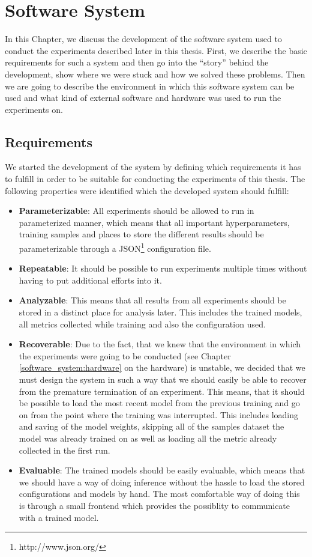 \chapter{Software System}
\label{software_system}
In this Chapter, we discuss the development of the software system used to conduct the experiments described later in this thesis. First, we describe the basic requirements for such a system and then go into the ``story'' behind the development, show where we were stuck and how we solved these problems. Then we are going to describe the environment in which this software system can be used and what kind of external software and hardware was used to run the experiments on.

\section{Requirements}
We started the development of the system by defining which requirements it has to fulfill in order to be suitable for conducting the experiments of this thesis. The following properties were identified which the developed system should fulfill:

\begin{itemize}
	\item \textbf{Parameterizable}: All experiments should be allowed to run in parameterized manner, which means that all important hyperparameters, training samples and places to store the different results should be parameterizable through a JSON\footnote{http://www.json.org/} configuration file.
	\item \textbf{Repeatable}: It should be possible to run experiments multiple times without having to put additional efforts into it.
	\item \textbf{Analyzable}: This means that all results from all experiments should be stored in a distinct place for analysis later. This includes the trained models, all metrics collected while training and also the configuration used.
	\item \textbf{Recoverable}: Due to the fact, that we knew that the environment in which the experiments were going to be conducted (see Chapter \ref{software_system:hardware} on the hardware) is unstable, we decided that we must design the system in such a way that we should easily be able to recover from the premature termination of an experiment. This means, that it should be possible to load the most recent model from the previous training and go on from the point where the training was interrupted. This includes loading and saving of the model weights, skipping all of the samples dataset the model was already trained on as well as loading all the metric already collected in the first run.
	\item \textbf{Evaluable}: The trained models should be easily evaluable, which means that we should have a way of doing inference without the hassle to load the stored configurations and models by hand. The most comfortable way of doing this is through a small frontend which provides the possiblity to communicate with a trained model.
\end{itemize}


